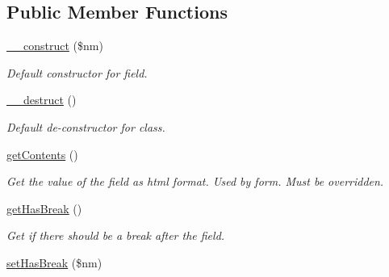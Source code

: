 \subsection*{Public Member Functions}
\begin{DoxyCompactItemize}
\item 
\hyperlink{class_fields_ac610fc08cbb0781b26136636de129bc0}{\-\_\-\-\_\-construct} (\$nm)
\begin{DoxyCompactList}\small\item\em Default constructor for field. \end{DoxyCompactList}\item 
\hypertarget{class_fields_a421831a265621325e1fdd19aace0c758}{\hyperlink{class_fields_a421831a265621325e1fdd19aace0c758}{\-\_\-\-\_\-destruct} ()}\label{class_fields_a421831a265621325e1fdd19aace0c758}

\begin{DoxyCompactList}\small\item\em Default de-\/constructor for class. \end{DoxyCompactList}\item 
\hypertarget{class_fields_a14814e04b348120748912692645f3a75}{\hyperlink{class_fields_a14814e04b348120748912692645f3a75}{get\-Contents} ()}\label{class_fields_a14814e04b348120748912692645f3a75}

\begin{DoxyCompactList}\small\item\em Get the value of the field as html format. Used by form. Must be overridden. \end{DoxyCompactList}\item 
\hypertarget{class_fields_a12c89cd171dcdb78019486e439cbc167}{\hyperlink{class_fields_a12c89cd171dcdb78019486e439cbc167}{get\-Has\-Break} ()}\label{class_fields_a12c89cd171dcdb78019486e439cbc167}

\begin{DoxyCompactList}\small\item\em Get if there should be a break after the field. \end{DoxyCompactList}\item 
\hypertarget{class_fields_ad299af8d6a2adbe4e29c512e97820887}{\hyperlink{class_fields_ad299af8d6a2adbe4e29c512e97820887}{set\-Has\-Break} (\$nm)}\label{class_fields_ad299af8d6a2adbe4e29c512e97820887}


\end{DoxyCompactItemize}
